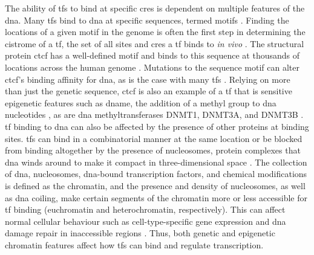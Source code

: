 The ability of \glspl{tf} to bind at specific \glspl{cre} is dependent on multiple features of the \gls{dna}.
Many \glspl{tf} bind to \gls{dna} at specific sequences, termed motifs \cite{farnhamInsightsGenomicProfiling2009,spitzTranscriptionFactorsEnhancer2012}.
Finding the locations of a given motif in the genome is often the first step in determining the cistrome of a \gls{tf}, the set of all sites and \glspl{cre} a \gls{tf} binds to \emph{in vivo} \cite{lupienCistromicsHormoneDependentCancer2009,liuCistromeIntegrativePlatform2011}.
The structural protein \gls{ctcf} has a well-defined motif and binds to this sequence at thousands of locations across the human genome \cite{kimAnalysisVertebrateInsulator2007,dixonTopologicalDomainsMammalian2012}.
Mutations to the sequence motif can alter \gls{ctcf}'s binding affinity for \gls{dna}, as is the case with many \glspl{tf} \cite{kasowskiVariationTranscriptionFactor2010,mauranoWidespreadSitedependentBuffering2012,mauranoLargescaleIdentificationSequence2015}.
Relying on more than just the genetic sequence, \Gls{ctcf} is also an example of a \gls{tf} that is sensitive epigenetic features such as \gls{dname}, the addition of a methyl group to \gls{dna} nucleotides \cite{mauranoRoleDNAMethylation2015,wangWidespreadPlasticityCTCF2012,wiehleDNAMethylationEmbryonic2019,xuNascentDNAMethylome2018,vinerModelingMethylsensitiveTranscription2016}, as are \gls{dna} methyltransferases DNMT1, DNMT3A, and DNMT3B \cite{gollEukaryoticCytosineMethyltransferases2005,listerHumanDNAMethylomes2009}.
\Gls{tf} binding to \gls{dna} can also be affected by the presence of other proteins at binding sites.
\Glspl{tf} can bind in a combinatorial manner at the same location \cite{farnhamInsightsGenomicProfiling2009,ongEnhancerFunctionNew2011,spitzTranscriptionFactorsEnhancer2012} or be blocked from binding altogether by the presence of nucleosomes, protein complexes that \gls{dna} winds around to make it compact in three-dimensional space \cite{henikoffNucleosomeDestabilizationEpigenetic2008,jiangNucleosomePositioningGene2009}.
The collection of \gls{dna}, nucleosomes, \gls{dna}-bound transcription factors, and chemical modifications is defined as the chromatin, and the presence and density of nucleosomes, as well as \gls{dna} coiling, make certain segments of the chromatin more or less accessible for \gls{tf} binding (euchromatin and heterochromatin, respectively).
This can affect normal cellular behaviour such as cell-type-specific gene expression \cite{vierstraGlobalReferenceMapping2020,cusanovichSingleCellAtlasVivo2018} and \gls{dna} damage repair in inaccessible regions \cite{polakCelloforiginChromatinOrganization2015}.
Thus, both genetic and epigenetic chromatin features affect how \glspl{tf} can bind and regulate transcription.

